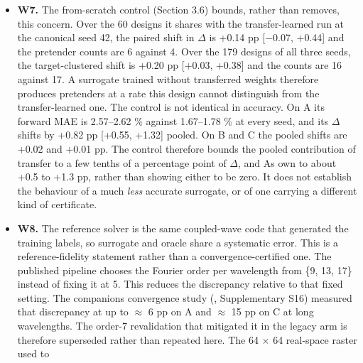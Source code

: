 \documentclass[11pt,a4paper]{article}
\begin{document}
\begin{itemize}
  n\_train = 300 labelled "n = 350". The other was a checkpoint normalization box of Wx,
  Wy \ensuremath{\in} {[}50, 400{]} nm against a dataset sampling those parameters to \textasciitilde720 nm. That box put a
  third of the committed C geometries outside {[}0, 1{]}. Both are \textbf{absent from the published
  pipeline audited here}: C trains on 350 of 487 reliable samples with the corrected
  bounds and the 18-feature set. They remain properties of the legacy arm of
  Section 3.10 and are one of the several differences that arm bundles together.
\item
  \textbf{W7.} The from-scratch control (Section 3.6) bounds, rather than removes, this
  concern. Over the 60 designs it shares with the transfer-learned run at the canonical seed 42, the paired shift in \ensuremath{\Delta} is +0.14 pp {[}\ensuremath{-}0.07, +0.44{]} and the pretender
  counts are 6 against 4. Over the 179 designs of all three seeds, the target-clustered
  shift is +0.20 pp {[}+0.03, +0.38{]} and the counts are 16 against 17. A surrogate trained
  without transferred weights therefore produces pretenders at a rate this design cannot
  distinguish from the transfer-learned one. The control is not identical in accuracy. On
  A its forward MAE is 2.57--2.62 \% against 1.67--1.78 \% at every seed, and its \ensuremath{\Delta} shifts by
  +0.82 pp {[}+0.55, +1.32{]} pooled. On B and C the pooled shifts are +0.02 and +0.01 pp. The
  control therefore bounds the pooled contribution of transfer to a few tenths of a
  percentage point of \ensuremath{\Delta}, and A\textquotesingle s own to about +0.5 to +1.3 pp, rather than showing either
  to be zero. It does not establish the behaviour of a much \emph{less} accurate surrogate, or of one carrying a different kind of certificate.
\item
  \textbf{W8.} The reference solver is the same coupled-wave code that generated the training
  labels, so surrogate and oracle share a systematic error. This is a reference-fidelity
  statement rather than a convergence-certified one. The published pipeline chooses the
  Fourier order per wavelength from \{9, 13, 17\} instead of fixing it at 5. This reduces
  the discrepancy relative to that fixed setting. The companion\textquotesingle s convergence study (\cite{choi20261},
  Supplementary S16) measured that discrepancy at up to \ensuremath{\approx} 6 pp on A and \ensuremath{\approx} 15 pp on C at
  long wavelengths. The order-7 revalidation that mitigated it in the legacy arm is
  therefore superseded rather than repeated here. The 64 \ensuremath{\times} 64 real-space raster used to

\end{itemize}
\end{document}
